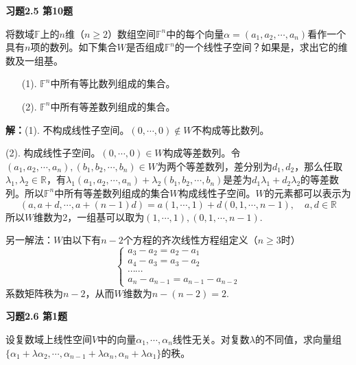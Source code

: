 \newpageorvspace

{\bf 习题2.5 第10题}

将数域$\mathbb{F}$上的$n$维（$n\geqslant 2$）数组空间$\mathbb{F}^n$中的每个向量$\alpha = (a_1,a_2,\cdots,a_n)$看作一个具有$n$项的数列。如下集合$W$是否组成$\mathbb{F}^n$的一个线性子空间？如果是，求出它的维数及一组基。
\begin{itemize}
\item[(1).] $\mathbb{F}^n$中所有等比数列组成的集合。
\item[(2).] $\mathbb{F}^n$中所有等差数列组成的集合。
\end{itemize}

{\bf 解：}(1). 不构成线性子空间。$(0,\cdots,0)\not\in W$不构成等比数列。

(2). 构成线性子空间。$(0,\cdots,0)\in W$构成等差数列。令$(a_1,a_2,\cdots,a_n), (b_1,b_2,\cdots,b_n)\in W$为两个等差数列，差分别为$d_1, d_2$，那么任取$\lambda_1, \lambda_2 \in \mathbb{R}$，有$\lambda_1(a_1,a_2,\cdots,a_n) + \lambda_2(b_1,b_2,\cdots,b_n)$是差为$d_1\lambda_1 + d_2\lambda_2$的等差数列。所以$\mathbb{F}^n$中所有等差数列组成的集合$W$构成线性子空间。$W$的元素都可以表示为
$$(a,a+d,\cdots,a+(n-1)d) = a(1,\cdots,1) + d(0,1,\cdots,n-1), \quad a,d\in\mathbb{R}$$
所以$W$维数为2，一组基可以取为$(1,\cdots,1), (0,1,\cdots,n-1)$.

另一解法：$W$由以下有$n-2$个方程的齐次线性方程组定义（$n\geqslant 3$时）
$$\begin{cases}
a_3-a_2 = a_2-a_1 \\
a_4-a_3 = a_3-a_2 \\
\cdots\cdots \\
a_n-a_{n-1} = a_{n-1}-a_{n-2}
\end{cases}$$
系数矩阵秩为$n-2$，从而$W$维数为$n-(n-2)=2$.

\newpageorvspace

{\bf 习题2.6 第1题}

设复数域上线性空间$V$中的向量$\alpha_1,\cdots,\alpha_n$线性无关。对复数$\lambda$的不同值，求向量组$\{ \alpha_1+\lambda\alpha_2, \cdots, \alpha_{n-1}+\lambda\alpha_n, \alpha_n+\lambda\alpha_1 \}$的秩。

